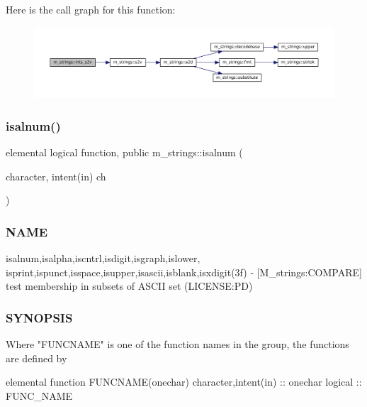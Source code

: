 Here is the call graph for this function\+:\nopagebreak
\begin{figure}[H]
\begin{center}
\leavevmode
\includegraphics[width=350pt]{namespacem__strings_a4e54d205168cab37d25119d74a9ead63_cgraph}
\end{center}
\end{figure}
\mbox{\label{namespacem__strings_ad8fd9bbf618bdba2c3ac9fb3c8174362}} 
\subsubsection{\texorpdfstring{isalnum()}{isalnum()}}
{\footnotesize\ttfamily elemental logical function, public m\+\_\+strings\+::isalnum (\begin{DoxyParamCaption}\item[{character, intent(in)}]{ch }\end{DoxyParamCaption})}



\subsubsection*{N\+A\+ME}

isalnum,isalpha,iscntrl,isdigit,isgraph,islower, isprint,ispunct,isspace,isupper,isascii,isblank,isxdigit(3f) -\/ \mbox{[}M\+\_\+strings\+:C\+O\+M\+P\+A\+RE\mbox{]} test membership in subsets of A\+S\+C\+II set (L\+I\+C\+E\+N\+SE\+:PD) 

\subsubsection*{S\+Y\+N\+O\+P\+S\+IS}

\begin{DoxyVerb}Where "FUNCNAME" is one of the function names in the group, the functions are defined by

 elemental function FUNCNAME(onechar)
 character,intent(in) :: onechar
 logical              :: FUNC_NAME
\end{DoxyVerb}
